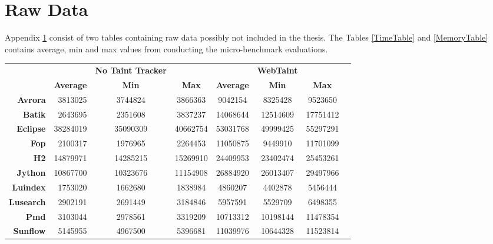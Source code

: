 \chapter{Raw Data}
\label{appendix:raw}
Appendix \ref{appendix:raw} consist of two tables containing raw data possibly not included in the thesis. The Tables \ref{TimeTable} and \ref{MemoryTable} contains average, min and max values from conducting the micro-benchmark evaluations.

\begin{sidewaystable}
  \centering
  \caption{Time measurements (ms) from executing the DaCapo Benchmark Suite, with and without WebTaint, ten times.}
  \label{TimeTable}
  \begin{tabular}{rrcccccc}
    & & \textbf{No Taint Tracker} & & & \textbf{WebTaint} & \\
    & \textbf{Average} & \textbf{Min} & \textbf{Max} & \textbf{Average} & \textbf{Min} & \textbf{Max} \\
    \textbf{Avrora}     & 3813025          & 3744824      & 3866363      & 9042154          & 8325428      & 9523650      \\
    \textbf{Batik}      & 2643695          & 2351608      & 3837237      & 14068644         & 12514609     & 17751412     \\
    \textbf{Eclipse}    & 38284019         & 35090309     & 40662754     & 53031768         & 49999425     & 55297291     \\
    \textbf{Fop}        & 2100317          & 1976965      & 2264453      & 11050875         & 9449910      & 11701099     \\
    \textbf{H2}         & 14879971         & 14285215     & 15269910     & 24409953         & 23402474     & 25453261     \\
    \textbf{Jython}     & 10867700         & 10323676     & 11154908     & 26884920         & 26013407     & 29497966     \\
    \textbf{Luindex}    & 1753020          & 1662680      & 1838984      & 4860207          & 4402878      & 5456444      \\
    \textbf{Lusearch}   & 2902191          & 2691449      & 3184846      & 5957591          & 5529709      & 6498355      \\
    \textbf{Pmd}        & 3103044          & 2978561      & 3319209      & 10713312         & 10198144     & 11478354     \\
    \textbf{Sunflow}    & 5145955          & 4967500      & 5396681      & 11039976         & 10644328     & 11523814     \\

\end{tabular}
\end{sidewaystable}
